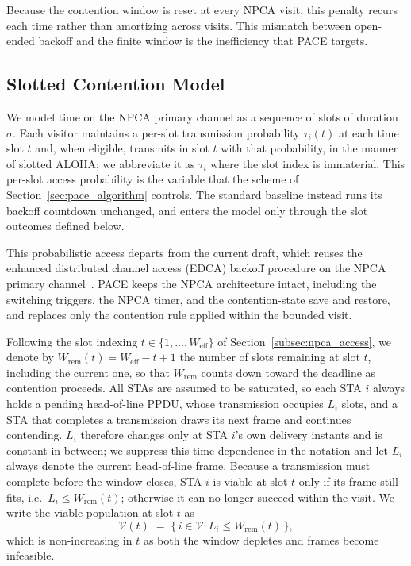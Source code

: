 \documentclass[conference]{IEEEtran}
\begin{document}
Because the contention window is reset at every NPCA visit, this penalty recurs each time rather than amortizing across visits. This mismatch between open-ended backoff and the finite window is the inefficiency that PACE targets.

\subsection{Slotted Contention Model}
\label{subsec:npca_window}

We model time on the NPCA primary channel as a sequence of slots of duration $\sigma$. Each visitor maintains a per-slot transmission probability $\tau_i(t)$ at each time slot $t$ and, when eligible, transmits in slot $t$ with that probability, in the manner of slotted ALOHA; we abbreviate it as $\tau_i$ where the slot index is immaterial. This per-slot access probability is the variable that the scheme of Section~\ref{sec:pace_algorithm} controls. The standard baseline instead runs its backoff countdown unchanged, and enters the model only through the slot outcomes defined below.

This probabilistic access departs from the current draft, which reuses
the enhanced distributed channel access (EDCA) backoff procedure on the NPCA primary channel~\cite{ieee80211bn}. PACE keeps the NPCA architecture intact, including the switching triggers, the NPCA timer, and the contention-state save and restore, and replaces only the contention rule applied within the bounded visit. 

Following the slot indexing $t\in\{1,\dots,W_\mathrm{eff}\}$ of Section~\ref{subsec:npca_access}, we denote by $W_\mathrm{rem}(t)=W_\mathrm{eff}-t+1$ the number of slots remaining at slot $t$, including the current one, so that $W_\mathrm{rem}$ counts down toward the deadline as contention proceeds. All STAs are assumed to be saturated, so each STA $i$ always holds a pending head-of-line PPDU, whose transmission occupies $L_i$ slots, and a STA that completes a transmission draws its next frame and continues contending. $L_i$ therefore changes only at STA $i$'s own delivery instants and is constant in between; we suppress this time dependence in the notation and let $L_i$ always denote the current head-of-line frame. Because a transmission must complete before the window closes, STA $i$ is viable at slot $t$ only if its frame still fits, i.e.\ $L_i \le W_\mathrm{rem}(t)$; otherwise it can no longer succeed within the visit. We write the viable population at slot $t$ as
\begin{equation}
    \mathcal{V}(t) \;=\; \bigl\{\, i\in\mathcal{V} :
    L_i \le W_\mathrm{rem}(t) \,\bigr\},
    \label{eq:viable}
\end{equation}
which is non-increasing in $t$ as both the window depletes and frames become infeasible.
\end{document}
